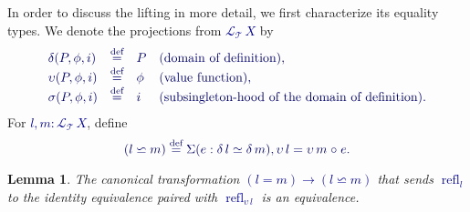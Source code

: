 \documentclass[10pt]{article}
\newcommand{\db}{\textcolor{darkblue}}
\newcommand{\m}[1]{\db{$#1$}}
\newcommand{\M}[1]{\[\db{#1}\]}
\newcommand{\comp}{\mathrel{\circ}}
\newcommand{\T}{\mathcal{T}}
\newcommand{\Lift}{\mathcal{L}}
\newcommand{\refl}{\operatorname{refl}}
\newcommand{\eqdef}{\overset{\text{def}}{=}}
\newtheorem{lemma}[numbered]{Lemma}
\theoremstyle{definition}
\begin{document}
In order to discuss the lifting in more detail, we first characterize
its equality types. We denote the projections from \m{\Lift_{\T}
  \, X} by
%
\M{
  \begin{array}{llll}
    \delta (P , \phi , i) & \eqdef & P & \text{(domain of definition),} \\
    \upsilon (P , \phi , i) & \eqdef & \phi & \text{(value function),} \\
    \sigma(P , \phi , i) & \eqdef & i & \text{(subsingleton-hood of the domain of definition).}
  \end{array}
}
%
For \m{l , m : \Lift_{\T} \, X}, define
\M{
  (l \backsimeq m) \eqdef \Sigma (e : \delta \, l \simeq \delta \, m), \upsilon \, l = \upsilon \, m \comp e.
}
\begin{lemma}
  The canonical transformation \m{(l = m) \to (l \backsimeq m)} that
  sends \m{\refl_l} to the identity equivalence paired with \m{\refl_{\upsilon \,
      l}} is an equivalence.
\end{lemma}
\end{document}
